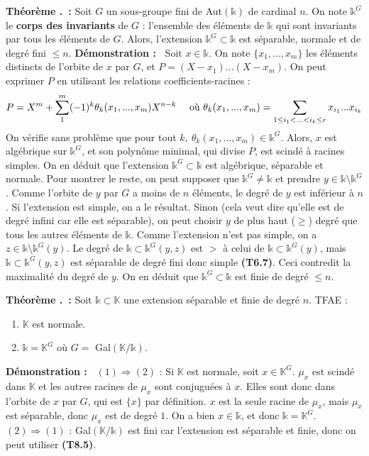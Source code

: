 \documentclass[5pt,a4paper]{article}
\newcounter{thm}[section]
\renewcommand{\thethm}{\thesection.\arabic{thm}}
\newcommand{\thm}[1]{\stepcounter{thm}\noindent\textbf{Théorème \thethm ~:} #1 \newline}
\newcommand{\thmEnum}[1]{\stepcounter{thm}\noindent\textbf{Théorème \thethm ~:} #1}
\newcommand{\demo}[1]{\textbf{Démonstration :~} #1 \newline}
\begin{document}
\begin{onehalfspacing}
\thm{Soit $G$ un sous-groupe fini de Aut$(\mathds{k})$ de cardinal $n$. On note $\mathds{k}^G$ le \textbf{corps des invariants} de $G$ : l'ensemble des éléments de $\mathds{k}$ qui sont invariants par tous les éléments de $G$. Alors, l'extension $\mathds{k}^G \subset \mathds{k}$ est séparable, normale et de degré fini $\leq n$.}
\demo{Soit $x \in \mathds{k}$. On note $\{x_1, ..., x_m\}$ les éléments distincts de l'orbite de $x$ par $G$, et $P = (X - x_1)...(X-x_m)$. On peut exprimer $P$ en utilisant les relations coefficients-racines : 
\[P = X^m + \sum_1^m (-1)^k\theta_k(x_1, ..., x_m)X^{n-k} ~~~~\textup{où}~\theta_k(x_1, ..., x_m) = \sum_{1 \leq i_1 < ... < i_k \leq r} x_{i_1}...x_{i_k}\]
On vérifie sans problème que pour tout $k,~\theta_k(x_1, ...,x_m) \in \mathds{k}^G$. Alors, $x$ est algébrique sur $\mathds{k}^G$, et son polynôme minimal, qui divise $P$, est scindé à racines simples. On en déduit que l'extension $\mathds{k}^G \subset \mathds{k}$ est algébrique, séparable et normale. Pour montrer le reste, on peut supposer que $\mathds{k}^G \neq \mathds{k}$ et prendre $y \in \mathds{k} \setminus \mathds{k}^G$. Comme l'orbite de $y$ par $G$ a moins de $n$ éléments, le degré de $y$ est inférieur à $n$. Si l'extension est simple, on a le résultat. Sinon (cela veut dire qu'elle est de degré infini car elle est séparable), on peut choisir $y$ de plus haut ($\geq$) degré que tous les autres éléments de $\mathds{k}$. Comme l'extension n'est pas simple, on a $z \in \mathds{k} \setminus \mathds{k}^G(y)$. Le degré de $\mathds{k} \subset \mathds{k}^G(y, z)$ est $>$ à celui de $\mathds{k} \subset \mathds{k}^G(y)$, mais $\mathds{k} \subset \mathds{k}^G(y, z)$ est séparable de degré fini donc simple \textbf{(T6.7)}. Ceci contredit la maximalité du degré de $y$. On en déduit que $\mathds{k}^G \subset \mathds{k}$ est finie de degré $\leq n$.}


\thmEnum{Soit $\mathds{k} \subset \mathbb{K}$ une extension séparable et finie de degré $n$. TFAE :
	\begin{enumerate}
	\item $\mathbb{K}$ est normale.
	\item $\mathds{k} = \mathbb{K}^G$ où $G =$ Gal$(\mathbb{K}/\mathds{k})$.
	\end{enumerate}
}
\demo{$(1) \Rightarrow (2)$ : Si $\mathbb{K}$ est normale, soit $x \in \mathbb{K}^G$. $\mu_x$ est scindé dans $\mathbb{K}$ et les autres racines de $\mu_x$ sont conjuguées à $x$. Elles sont donc dans l'orbite de $x$ par $G$, qui est $\{x\}$ par définition. $x$ est la seule racine de $\mu_x$, mais $\mu_x$ est séparable, donc $\mu_x$ est de degré $1$. On a bien $x \in \mathds{k}$, et donc $\mathds{k} = \mathbb{K}^G$.\\
$(2) \Rightarrow (1)$ : Gal$(\mathbb{K}/\mathds{k})$ est fini car l'extension est séparable et finie, donc on peut utiliser \textbf{(T8.5)}.}



\end{onehalfspacing}
\end{document}
